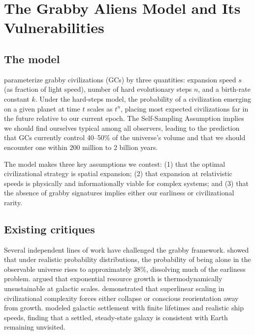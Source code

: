 \documentclass[12pt, a4paper]{article}
\begin{document}
\section{The Grabby Aliens Model and Its Vulnerabilities}

\subsection{The model}

\citet{hanson2021} parameterize grabby civilizations (GCs) by three quantities: expansion
speed $s$ (as fraction of light speed), number of hard evolutionary steps $n$, and a
birth-rate constant $k$. Under the hard-steps model, the probability of a civilization
emerging on a given planet at time $t$ scales as $t^n$, placing most expected civilizations
far in the future relative to our current epoch. The Self-Sampling Assumption implies we
should find ourselves typical among all observers, leading to the prediction that GCs
currently control 40--50\% of the universe's volume and that we should encounter one within
$200$ million to $2$ billion years.

The model makes three key assumptions we contest: (1) that the optimal civilizational
strategy is spatial expansion; (2) that expansion at relativistic speeds is physically and
informationally viable for complex systems; and (3) that the absence of grabby signatures
implies either our earliness or civilizational rarity.

\subsection{Existing critiques}

Several independent lines of work have challenged the grabby framework.
\citet{sandberg2018} showed that under realistic probability distributions, the probability
of being alone in the observable universe rises to approximately 38\%, dissolving much of the
earliness problem. \citet{haqqmisra2009} argued that exponential resource growth is
thermodynamically unsustainable at galactic scales. \citet{wong2022} demonstrated that
superlinear scaling in civilizational complexity forces either collapse or conscious
reorientation away from growth. \citet{carroll2019} modeled galactic settlement with finite
lifetimes and realistic ship speeds, finding that a settled, steady-state galaxy is
consistent with Earth remaining unvisited.
\end{document}
